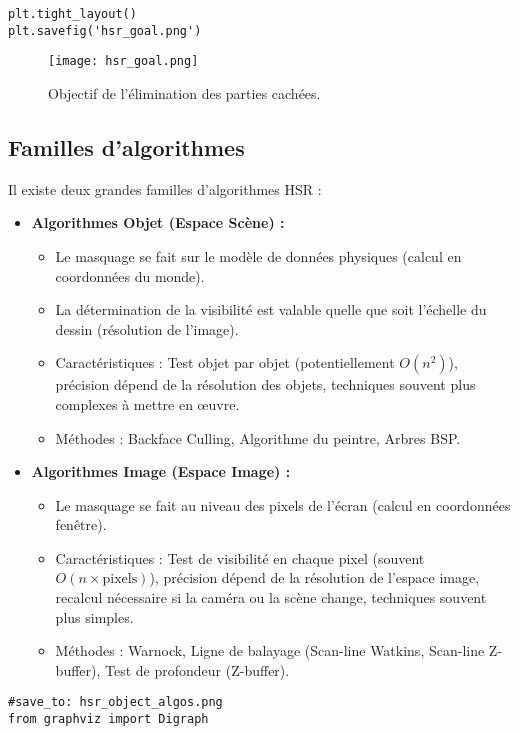 \documentclass{article}
\begin{document}
{\begin{verbatim}
plt.tight_layout()
plt.savefig('hsr_goal.png')
\end{verbatim}

\begin{figure}[H]
\centering
\texttt{[image: hsr\_goal.png]}
\caption{Objectif de l'élimination des parties cachées.}
\label{fig:hsr_goal}
\end{figure}

\subsection{Familles d'algorithmes}
Il existe deux grandes familles d'algorithmes HSR :

\begin{itemize}
    \item \textbf{Algorithmes Objet (Espace Scène) :}
    \begin{itemize}
        \item Le masquage se fait sur le modèle de données physiques (calcul en coordonnées du monde).
        \item La détermination de la visibilité est valable quelle que soit l'échelle du dessin (résolution de l'image).
        \item Caractéristiques : Test objet par objet (potentiellement $O(n^2)$), précision dépend de la résolution des objets, techniques souvent plus complexes à mettre en œuvre.
        \item Méthodes : Backface Culling, Algorithme du peintre, Arbres BSP.
    \end{itemize}
    \item \textbf{Algorithmes Image (Espace Image) :}
    \begin{itemize}
        \item Le masquage se fait au niveau des pixels de l'écran (calcul en coordonnées fenêtre).
        \item Caractéristiques : Test de visibilité en chaque pixel (souvent $O(n \times \text{pixels})$), précision dépend de la résolution de l'espace image, recalcul nécessaire si la caméra ou la scène change, techniques souvent plus simples.
        \item Méthodes : Warnock, Ligne de balayage (Scan-line Watkins, Scan-line Z-buffer), Test de profondeur (Z-buffer).
    \end{itemize}
\end{itemize}

\begin{verbatim}
#save_to: hsr_object_algos.png
from graphviz import Digraph


\end{verbatim}}
\end{document}
